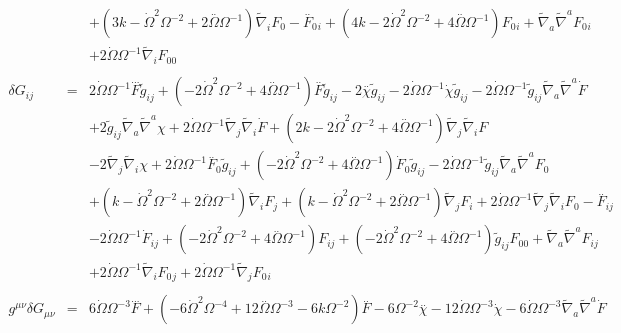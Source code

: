 \documentclass[10pt,letterpaper]{article}
\numberwithin{equation}{section}
\begin{document}
\begin{eqnarray}
&& + (3 k -  \dot{\Omega}^2 \Omega^{-2} + 2 \overset{..}{\Omega} \Omega^{-1}) \tilde{\nabla}_{i}F_{0}{}- \overset{..}{F}_{0}{}_{i} + (4 k - 2 \dot{\Omega}^2 \Omega^{-2} + 4 \overset{..}{\Omega} \Omega^{-1}) F_{0}{}_{i} + \tilde{\nabla}_{a}\tilde{\nabla}^{a}F_{0}{}_{i} \nonumber \\ 
&& + 2 \dot{\Omega} \Omega^{-1} \tilde{\nabla}_{i}F_{00}{}
\\  \nonumber\\ 
\delta G_{ij}&=& 2 \dot{\Omega} \Omega^{-1} \overset{...}{F} \tilde{g}_{ij} + (-2 \dot{\Omega}^2 \Omega^{-2} + 4 \overset{..}{\Omega} \Omega^{-1}) \overset{..}{F} \tilde{g}_{ij} - 2 \overset{..}{\chi} \tilde{g}_{ij} - 2 \dot{\Omega} \Omega^{-1} \dot{\chi} \tilde{g}_{ij} - 2 \dot{\Omega} \Omega^{-1} \tilde{g}_{ij} \tilde{\nabla}_{a}\tilde{\nabla}^{a}\dot{F} \nonumber \\ 
&& + 2 \tilde{g}_{ij} \tilde{\nabla}_{a}\tilde{\nabla}^{a}\chi + 2 \dot{\Omega} \Omega^{-1} \tilde{\nabla}_{j}\tilde{\nabla}_{i}\dot{F} + (2 k - 2 \dot{\Omega}^2 \Omega^{-2} + 4 \overset{..}{\Omega} \Omega^{-1}) \tilde{\nabla}_{j}\tilde{\nabla}_{i}F \nonumber \\ 
&& - 2 \tilde{\nabla}_{j}\tilde{\nabla}_{i}\chi +2 \dot{\Omega} \Omega^{-1} \overset{..}{F}_{0}{} \tilde{g}_{ij} + (-2 \dot{\Omega}^2 \Omega^{-2} + 4 \overset{..}{\Omega} \Omega^{-1}) \dot{F}_{0}{} \tilde{g}_{ij} - 2 \dot{\Omega} \Omega^{-1} \tilde{g}_{ij} \tilde{\nabla}_{a}\tilde{\nabla}^{a}F_{0}{} \nonumber \\ 
&& + (k -  \dot{\Omega}^2 \Omega^{-2} + 2 \overset{..}{\Omega} \Omega^{-1}) \tilde{\nabla}_{i}F_{j} + (k -  \dot{\Omega}^2 \Omega^{-2} + 2 \overset{..}{\Omega} \Omega^{-1}) \tilde{\nabla}_{j}F_{i} + 2 \dot{\Omega} \Omega^{-1} \tilde{\nabla}_{j}\tilde{\nabla}_{i}F_{0}{}- \overset{..}{F}_{ij} \nonumber \\ 
&& - 2 \dot{\Omega} \Omega^{-1} \dot{F}_{ij} + (-2 \dot{\Omega}^2 \Omega^{-2} + 4 \overset{..}{\Omega} \Omega^{-1}) F_{ij} + (-2 \dot{\Omega}^2 \Omega^{-2} + 4 \overset{..}{\Omega} \Omega^{-1}) \tilde{g}_{ij} F_{00}{} + \tilde{\nabla}_{a}\tilde{\nabla}^{a}F_{ij} \nonumber \\ 
&& + 2 \dot{\Omega} \Omega^{-1} \tilde{\nabla}_{i}F_{0}{}_{j} + 2 \dot{\Omega} \Omega^{-1} \tilde{\nabla}_{j}F_{0}{}_{i}
\\  \nonumber\\ 
g^{\mu\nu}\delta G_{\mu\nu}&=& 6 \dot{\Omega} \Omega^{-3} \overset{...}{F} + (-6 \dot{\Omega}^2 \Omega^{-4} + 12 \overset{..}{\Omega} \Omega^{-3} - 6 k \Omega^{-2}) \overset{..}{F} - 6 \Omega^{-2} \overset{..}{\chi} - 12 \dot{\Omega} \Omega^{-3} \dot{\chi} - 6 \dot{\Omega} \Omega^{-3} \tilde{\nabla}_{a}\tilde{\nabla}^{a}\dot{F} \nonumber \\ 

\end{eqnarray}
\end{document}
